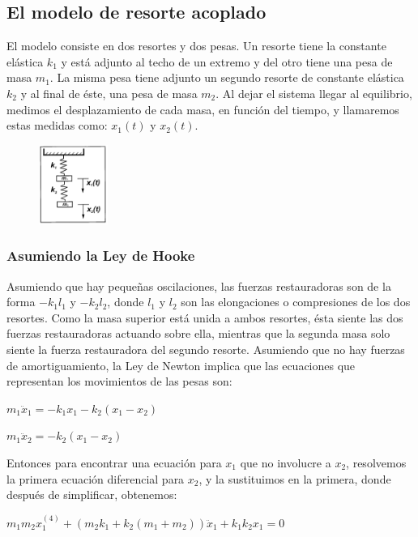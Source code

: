\documentclass[a4paper]{article}
\begin{document}
\subsection{El modelo de resorte acoplado}
El modelo consiste en dos resortes y dos pesas. Un resorte tiene la constante elástica $k_1$ y está adjunto al techo de un extremo y del otro tiene una pesa de masa $m_1$. La misma pesa tiene adjunto un segundo resorte de constante elástica $k_2$ y al final de éste, una pesa de masa $m_2$. Al dejar el sistema llegar al equilibrio, medimos el desplazamiento de cada masa, en función del tiempo, y llamaremos estas medidas como: $x_1(t)$ y $x_2(t)$.

\begin{figure}[h]
 \centering
  \includegraphics[width=0.2\textwidth]{ModeloResorte.PNG}
\end{figure}

\subsubsection{Asumiendo la Ley de Hooke}
Asumiendo que hay pequeñas oscilaciones, las fuerzas restauradoras son de la forma $- k_1l_1$ y $- k_2l_2$, donde $l_1$ y $l_2$ son las elongaciones o compresiones de los dos resortes. Como la masa superior está unida a ambos resortes, ésta siente las dos fuerzas restauradoras actuando sobre ella, mientras que la segunda masa solo siente la fuerza restauradora del segundo resorte. Asumiendo que no hay fuerzas de amortiguamiento, la Ley de Newton implica que las ecuaciones que representan los movimientos de las pesas son:

\begin{center}
$m_1\ddot x_1 = - k_1x_1 - k_2(x_1 - x_2)$

$m_1\ddot x_2 = - k_2(x_1 - x_2)$
\end{center}

Entonces para encontrar una ecuación para $x_1$ que no involucre a $x_2$, resolvemos la primera ecuación diferencial para $x_2$, y la sustituimos en la primera, donde después de simplificar, obtenemos:

\begin{center}
$m_1m_2x_1^{(4)} + (m_2k_1 + k_2(m_1 + m_2))\ddot x_1 + k_1k_2x_1 = 0$
\end{center}
\end{document}
